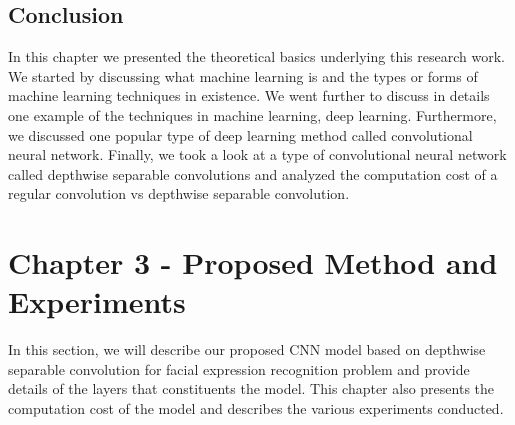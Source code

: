 \documentclass[master]{thesis-uestc}
\begin{document}
\section{Conclusion}
In this chapter we presented the theoretical basics underlying this research work. We started by discussing what machine learning is and the types or forms of machine learning techniques in existence. We went further to discuss in details one example of the techniques in machine learning, deep learning. Furthermore, we discussed one popular type of deep learning method called convolutional neural network. Finally, we took a look at a type of convolutional neural network called depthwise separable convolutions and analyzed the computation cost of a regular convolution vs depthwise separable convolution.

\chapter{Chapter 3 - Proposed Method and Experiments}
In this section, we will describe our proposed CNN model based on depthwise separable convolution for facial expression recognition problem and provide details of the layers that constituents the model. This chapter also presents the computation cost of the model and describes the various experiments conducted.
\end{document}
